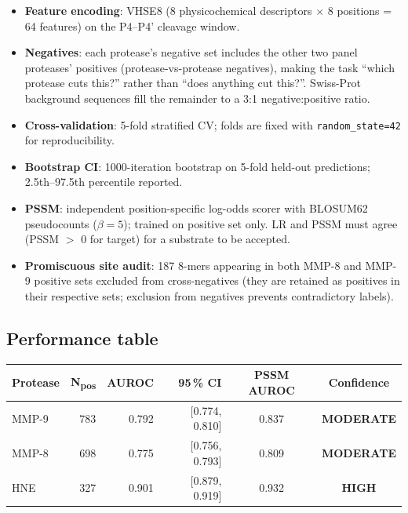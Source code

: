 \documentclass[10pt,a4paper]{article}
\newcommand{\hi}[1]{\textcolor{highgreen}{\textbf{#1}}}
\newcommand{\md}[1]{\textcolor{modamber}{\textbf{#1}}}
\begin{document}
\begin{itemize}[topsep=2pt,itemsep=1pt,leftmargin=*]
  \item \textbf{Feature encoding}: VHSE8 (8 physicochemical descriptors
    $\times$ 8 positions = 64 features) on the P4--P4' cleavage window.
  \item \textbf{Negatives}: each protease's negative set includes the
    other two panel proteases' positives (protease-vs-protease negatives),
    making the task ``which protease cuts this?'' rather than ``does
    anything cut this?''.  Swiss-Prot background sequences fill the
    remainder to a 3:1 negative:positive ratio.
  \item \textbf{Cross-validation}: 5-fold stratified CV; folds are
    fixed with \texttt{random\_state=42} for reproducibility.
  \item \textbf{Bootstrap CI}: 1000-iteration bootstrap on 5-fold
    held-out predictions; 2.5th--97.5th percentile reported.
  \item \textbf{PSSM}: independent position-specific log-odds scorer
    with BLOSUM62 pseudocounts ($\beta{=}5$); trained on positive set only.
    LR and PSSM must agree (PSSM $>$ 0 for target) for a substrate to
    be accepted.
  \item \textbf{Promiscuous site audit}: 187 8-mers appearing in both
    MMP-8 and MMP-9 positive sets excluded from cross-negatives (they
    are retained as positives in their respective sets; exclusion from
    negatives prevents contradictory labels).
\end{itemize}

\subsection{Performance table}

\begin{center}
\begin{tabular}{lrrrcc}
  \toprule
  Protease & N\textsubscript{pos} & AUROC & \textbf{95\,\% CI} & PSSM AUROC & Confidence\\
  \midrule
  MMP-9 & 783 & 0.792 & [0.774, 0.810] & 0.837 & \md{MODERATE}\\
  MMP-8 & 698 & 0.775 & [0.756, 0.793] & 0.809 & \md{MODERATE}\\
  HNE   & 327 & 0.901 & [0.879, 0.919] & 0.932 & \hi{HIGH}\\
  \bottomrule
\end{tabular}
\end{center}
\end{document}
